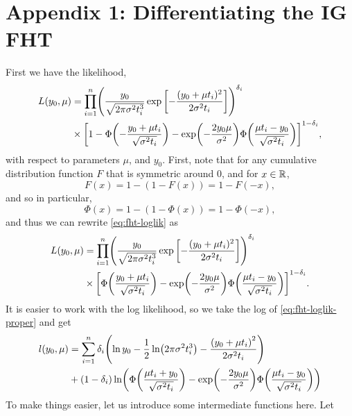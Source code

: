 \chapter{Appendix 1: Differentiating the IG FHT}\label{appendix}
First we have the likelihood,
\begin{align}\label{eq:fht-loglik}
\begin{split}
L(y_0,\mu)&=\prod_{i=1}^n\p*{\frac{y_0}{\sqrt{2\pi\sigma^2\ti^3}}\exp\left[-\frac{(y_0+\mu \ti)^2}{2\sigma^2\ti}\right]}^{\di}\\
&\times\sqb*{1-\Phi\p*{-\frac{y_0+\mu \ti}{\sqrt{\sigma^2\ti}}}-\exp\p*{-\frac{2y_0\mu}{\sigma^2}}\Phi\p*{\frac{\mu \ti-y_0}{\sqrt{\sigma^2\ti}}}}^{1-\di},
\end{split}
\end{align}
with respect to parameters $\mu$, and $y_0$. First, note that for any cumulative distribution function $F$ that is symmetric around 0, and for $x\in\mathbb{R}$,
\begin{equation}
    F(x)=1-(1-F(x))=1-F(-x),
\end{equation}
and so in particular,
\begin{equation}
    \Phi(x)=1-(1-\Phi(x))=1-\Phi(-x),
\end{equation}
and thus we can rewrite \eqref{eq:fht-loglik} as
\begin{align}\label{eq:fht-loglik-proper}
\begin{split}
L(y_0,\mu)&=\prod_{i=1}^n\p*{\frac{y_0}{\sqrt{2\pi\sigma^2\ti^3}}\exp\left[-\frac{(y_0+\mu \ti)^2}{2\sigma^2\ti}\right]}^{\di}\\
&\times\sqb*{\Phi\p*{\frac{y_0+\mu \ti}{\sqrt{\sigma^2\ti}}}-\exp\p*{-\frac{2y_0\mu}{\sigma^2}}\Phi\p*{\frac{\mu \ti-y_0}{\sqrt{\sigma^2\ti}}}}^{1-\di}.
\end{split}
\end{align}
It is easier to work with the log likelihood, so we take the log of \eqref{eq:fht-loglik-proper} and get
\begin{align}
\begin{split}
    l(y_0,\mu)&=\sum_{i=1}^n\di\p*{\ln y_0-\frac{1}{2}\ln\p*{2\pi\sigma^2\ti^3}-\frac{\p*{y_0+\mu\ti}^2}{2\sigma^2\ti}} \\
    &+
    (1-\di)\ln\p*{\Phi\p*{\frac{\mu\ti+y_0}{\sqrt{\sigma^2\ti}}}-\exp\p*{-\frac{2y_0\mu}{\sigma^2}}\Phi\p*{\frac{\mu\ti-y_0}{\sqrt{\sigma^2\ti}}}}
\end{split}
\end{align}
To make things easier, let us introduce some intermediate functions here. Let
